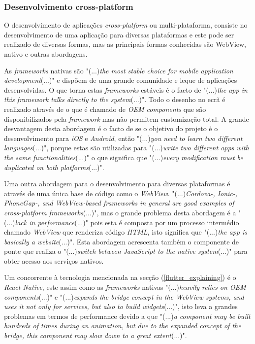 \subsubsection{Desenvolvimento cross-platform}
O desenvolvimento de aplicações \textit{cross-platform} ou multi-plataforma, consiste no desenvolvimento de uma aplicação para diversas plataformas e este pode ser realizado de diversas formas, mas as principais formas conhecidas são WebView, nativo e outras abordagens.

As \emph{frameworks} nativas são "(...)\emph{the most stable choice for mobile application development}(...)"\citep{flutter} e dispõem de uma grande comunidade e leque de aplicações desenvolvidas. O que torna estas \textit{frameworks} estáveis é o facto de "(...)\emph{the app in this framework talks directly to the system}(...)"\citep{flutter}. Todo o desenho no ecrã é realizado através de o que é chamado de \emph{OEM components} que são disponibilizados pela \emph{framework} mas não permitem customização total. A grande desvantagem desta abordagem é o facto de se o objetivo do projeto é o desenvolvimento para \textit{iOS} e \textit{Android}, então "(...)\emph{you need to learn two different languages}(...)"\citep{flutter}, porque estas são utilizadas para "(...)\emph{write two different apps with the same functionalities}(...)"\citep{flutter} o que significa que "(...)\emph{every modification must be duplicated on both platforms}(...)"\citep{flutter}.

Uma outra abordagem para o desenvolvimento para diversas plataformas é através de uma única base de código como o \textit{WebView}. "(...)\emph{Cordova-, Ionic-, PhoneGap-, and WebView-based frameworks in general are good examples of cross-platform frameworks}(...)"\citep{flutter}, mas o grande problema desta abordagem é a "(...)\emph{lack in performance}(...)"\citep{flutter} pois esta é composta por um processo intermédio chamado \textit{WebView} que renderiza código \textit{HTML}, isto significa que "(...)\emph{the app is basically a website}(...)"\citep{flutter}.
Esta abordagem acrescenta também o componente de ponte que realiza o "(...)\emph{switch between JavaScript to the native system}(...)"\citep{flutter} para obter acesso aos serviços nativos.

Um concorrente à tecnologia mencionada na secção (\ref{flutter_explaining}) é o \textit{React Native}, este assim como as \textit{frameworks} nativas "(...)\emph{heavily relies on OEM components}(...)"\citep{flutter} e "(...)\emph{expands the bridge concept in the WebView systems, and uses it not only for services, but also to build widgets}(...)"\citep{flutter}, isto leva a grandes problemas em termos de performance devido a que "(...)\emph{a component may be built hundreds of times during an animation, but due to the expanded concept of the bridge, this component may slow down to a great extent}(...)"\citep{flutter}.